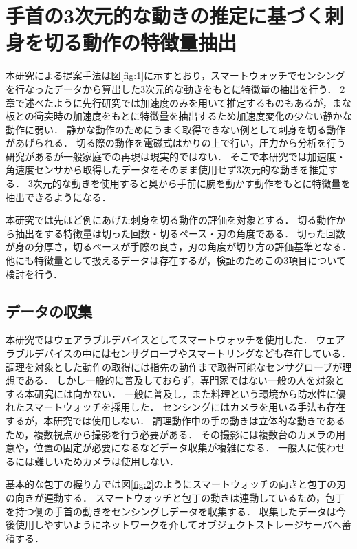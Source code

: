 \chapter{手首の3次元的な動きの推定に基づく刺身を切る動作の特徴量抽出}
本研究による提案手法は図\ref{fig:1}に示すとおり，スマートウォッチでセンシングを行なったデータから算出した3次元的な動きをもとに特徴量の抽出を行う．
2章で述べたように先行研究\cite{kumazawaanalysis}では加速度のみを用いて推定するものもあるが，まな板との衝突時の加速度をもとに特徴量を抽出するため加速度変化の少ない静かな動作に弱い．
静かな動作のためにうまく取得できない例として刺身を切る動作があげられる．
切る際の動作を電磁式はかりの上で行い，圧力から分析を行う研究\cite{切断操作が及ぼす食材へのダメージ評価}があるが一般家庭での再現は現実的ではない．
そこで本研究では加速度・角速度センサから取得したデータをそのまま使用せず3次元的な動きを推定する．
3次元的な動きを使用すると奥から手前に腕を動かす動作をもとに特徴量を抽出できるようになる．

本研究では先ほど例にあげた刺身を切る動作の評価を対象とする．
切る動作から抽出をする特徴量は切った回数・切るペース・刃の角度である．
切った回数が身の分厚さ，切るペースが手際の良さ，刃の角度が切り方の評価基準となる．
他にも特徴量として扱えるデータは存在するが，検証のためこの3項目について検討を行う．

\section{データの収集}
本研究ではウェアラブルデバイスとしてスマートウォッチを使用した．
ウェアラブルデバイスの中にはセンサグローブやスマートリングなども存在している．
調理を対象とした動作の取得には指先の動作まで取得可能なセンサグローブが理想である．
しかし一般的に普及しておらず，専門家ではない一般の人を対象とする本研究には向かない．
一般に普及し，また料理という環境から防水性に優れたスマートウォッチを採用した．
センシングにはカメラを用いる手法も存在するが，本研究では使用しない．
調理動作中の手の動きは立体的な動きであるため，複数視点から撮影を行う必要がある．
その撮影には複数台のカメラの用意や，位置の固定が必要になるなどデータ収集が複雑になる．
一般人に使わせるには難しいためカメラは使用しない．

基本的な包丁の握り方では図\ref{fig:2}のようにスマートウォッチの向きと包丁の刃の向きが連動する．
スマートウォッチと包丁の動きは連動しているため，包丁を持つ側の手首の動きをセンシングしデータを収集する．
収集したデータは今後使用しやすいようにネットワークを介してオブジェクトストレージサーバへ蓄積する．
